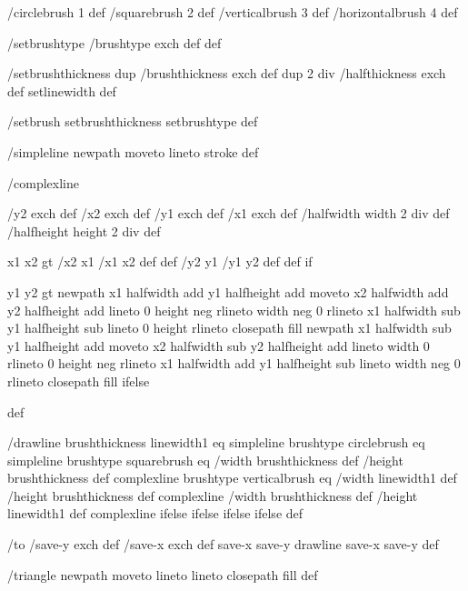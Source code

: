 /circlebrush     1 def
/squarebrush     2 def
/verticalbrush   3 def
/horizontalbrush 4 def

/setbrushtype { /brushtype exch def } def

/setbrushthickness
  { dup /brushthickness exch def
    dup 2 div /halfthickness exch def
    setlinewidth } def

/setbrush { setbrushthickness setbrushtype } def

/simpleline { newpath moveto lineto stroke } def

/complexline
  { /y2 exch def /x2 exch def
    /y1 exch def /x1 exch def
    /halfwidth width 2 div def
    /halfheight height 2 div def

    x1 x2 gt { /x2 x1 /x1 x2 def def /y2 y1 /y1 y2 def def } if

    y1 y2 gt
     { %
       newpath
        x1 halfwidth add y1 halfheight add moveto
	x2 halfwidth add y2 halfheight add lineto
	0 height neg rlineto
        width neg 0 rlineto
        x1 halfwidth sub y1 halfheight sub lineto
        0 height rlineto
        closepath
	fill }
     { %
       newpath
        x1 halfwidth sub y1 halfheight add moveto
	x2 halfwidth sub y2 halfheight add lineto
	width 0 rlineto
	0 height neg rlineto
	x1 halfwidth add y1 halfheight sub lineto
	width neg 0 rlineto
	closepath
	fill }
     ifelse } def

/drawline
  { brushthickness linewidth1 eq
    { simpleline }
    { brushtype circlebrush eq
       { %
         simpleline }
       { brushtype squarebrush eq
          { %
            /width brushthickness def
	    /height brushthickness def
	    complexline }
          { brushtype verticalbrush eq
             { %
	       /width linewidth1 def
	       /height brushthickness def
	       complexline }
             { %
	       /width brushthickness def
	       /height linewidth1 def
	       complexline }
             ifelse }
          ifelse }
       ifelse }
    ifelse } def

/to
 { /save-y exch def
   /save-x exch def
   save-x save-y drawline
   save-x save-y } def

/triangle
 { newpath moveto lineto lineto closepath fill } def

